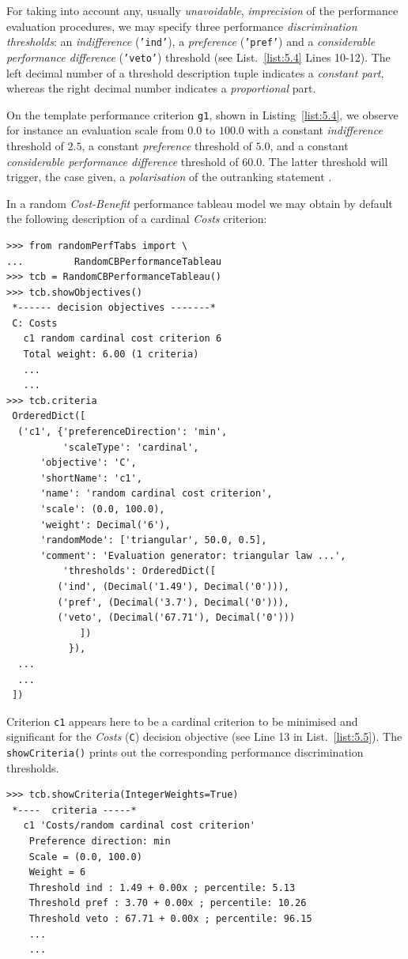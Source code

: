 For taking into account any, usually \emph{unavoidable}, \emph{imprecision} of the performance evaluation procedures, we may specify three performance \emph{discrimination thresholds}: an \emph{indifference} (\texttt{'ind'}), a \emph{preference} (\texttt{'pref'}) and a \emph{considerable performance difference} (\texttt{'veto'}) threshold (see List.~\vref{list:5.4} Lines 10-12). The left decimal number of a threshold description tuple indicates a \emph{constant part}, whereas the right decimal number indicates a \emph{proportional} part.

On the template performance criterion \texttt{g1}, shown in Listing~\vref{list:5.4}, we observe for instance an evaluation scale from $0.0$ to $100.0$ with a constant \emph{indifference} threshold of $2.5$, a constant \emph{preference} threshold of $5.0$, and a constant \emph{considerable performance difference} threshold of $60.0$. The latter threshold  will trigger, the case given, a \emph{polarisation} of the outranking statement \citep{BIS-2013}.

In a random \emph{Cost-Benefit} performance tableau model we may obtain by default the following description of a cardinal \emph{Costs} criterion:
\begin{lstlisting}[caption={Example of cardinal \emph{Costs} criterion},label=list:5.5]
>>> from randomPerfTabs import \
...         RandomCBPerformanceTableau
>>> tcb = RandomCBPerformanceTableau()
>>> tcb.showObjectives()
 *------ decision objectives -------*
 C: Costs
   c1 random cardinal cost criterion 6
   Total weight: 6.00 (1 criteria)
   ...
   ...
>>> tcb.criteria
 OrderedDict([
  ('c1', {'preferenceDirection': 'min',
          'scaleType': 'cardinal',
	  'objective': 'C',
	  'shortName': 'c1',
	  'name': 'random cardinal cost criterion',
	  'scale': (0.0, 100.0),
	  'weight': Decimal('6'),
	  'randomMode': ['triangular', 50.0, 0.5],
	  'comment': 'Evaluation generator: triangular law ...',
          'thresholds': OrderedDict([
	     ('ind', (Decimal('1.49'), Decimal('0'))),
	     ('pref', (Decimal('3.7'), Decimal('0'))),
	     ('veto', (Decimal('67.71'), Decimal('0')))
             ])
           }),
  ...
  ...
 ])
\end{lstlisting}

Criterion \texttt{c1} appears here to be a cardinal criterion to be minimised and significant for the \emph{Costs} (\texttt{C}) decision objective (see Line 13 in List.~\vref{list:5.5}). The \texttt{showCriteria()} prints out the corresponding performance discrimination thresholds.
\begin{lstlisting}
>>> tcb.showCriteria(IntegerWeights=True)
 *----  criteria -----*
   c1 'Costs/random cardinal cost criterion'
    Preference direction: min
    Scale = (0.0, 100.0)
    Weight = 6 
    Threshold ind : 1.49 + 0.00x ; percentile: 5.13
    Threshold pref : 3.70 + 0.00x ; percentile: 10.26
    Threshold veto : 67.71 + 0.00x ; percentile: 96.15
    ...
    ...
\end{lstlisting}

